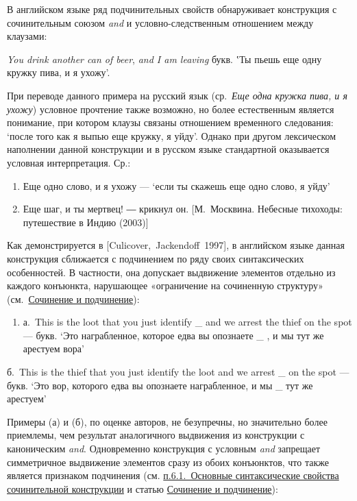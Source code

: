 В английском языке ряд подчинительных свойств обнаруживает конструкция с
сочинительным союзом \textit{and} и условно-следственным отношением между
клаузами:

\textit{You drink another can of beer}, \textit{and I am leaving} букв. ʽТы
пьешь еще одну кружку пива, и я ухожу'.

При переводе данного примера на русский язык (ср.~\textit{Еще одна кружка
пива, и я ухожу}) условное прочтение также возможно, но более
естественным является понимание, при котором клаузы связаны отношением
временного следования: `после того как я выпью еще кружку, я уйду'.
Однако при другом лексическом наполнении данной конструкции и в русском
языке стандартной оказывается условная интерпретация. Ср.:

\begin{enumerate}
\def\labelenumi{(\arabic{enumi})}
\setcounter{enumi}{57}
\item
  Еще одно слово, и я ухожу --- `если ты скажешь еще одно слово, я уйду'
\item
  Еще шаг, и ты мертвец! ― крикнул он. {[}М.~Москвина. Небесные
  тихоходы: путешествие в Индию (2003){]}
\end{enumerate}

Как демонстрируется в {[}Culicover,~Jackendoff~1997{]}, в английском
языке данная конструкция сближается с подчинением по ряду своих
синтаксических особенностей. В частности, она допускает выдвижение
элементов отдельно из каждого конъюнкта, нарушающее «ограничение на
сочиненную структуру» (см.~\underline{Сочинение и подчинение}):

\begin{enumerate}
\def\labelenumi{(\arabic{enumi})}
\setcounter{enumi}{59}
\item
  а.~This is the loot that you just identify \_ and we arrest the thief
  on the spot --- букв. `Это награбленное, которое едва вы опознаете \_ ,
  и мы тут же арестуем вора'
\end{enumerate}

б.~This is the thief that you just identify the loot and we arrest \_ on
the spot --- букв. `Это вор, которого едва вы опознаете награбленное, и
мы \_ тут же арестуем'

Примеры (а) и (б), по оценке авторов, не безупречны, но значительно
более приемлемы, чем результат аналогичного выдвижения из конструкции с
каноническим \textit{and}. Одновременно конструкция с условным \textit{and}
запрещает симметричное выдвижение элементов сразу из обоих конъюнктов,
что также является признаком подчинения (см. \underline{п.6.1.~Основные
синтаксические свойства сочинительной конструкции} и статью
\underline{Сочинение и подчинение}):

